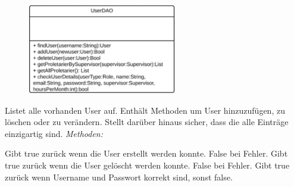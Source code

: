 \begin{itemize}
                \begin{figure}[htb]
                \centering
                \includegraphics[width=6.5cm]{Diagramms/class/singleclass/UserDao.pdf}
                \end{figure}
                \newline
                Listet alle vorhanden User auf. Enthält Methoden um User hinzuzufügen, zu löschen oder zu verändern. Stellt darüber hinaus sicher, dass die alle Einträge einzigartig sind.
                \emph{Methoden:}
                \begin{itemize}
                       Gibt true zurück wenn die User erstellt werden konnte.
                       False bei Fehler.
                       Gibt true zurück wenn die User gelöscht werden konnte.
                       False bei Fehler.
                       Gibt true zurück wenn Username und Passwort korrekt sind, sonst false.
                \end{itemize}


\end{itemize}
